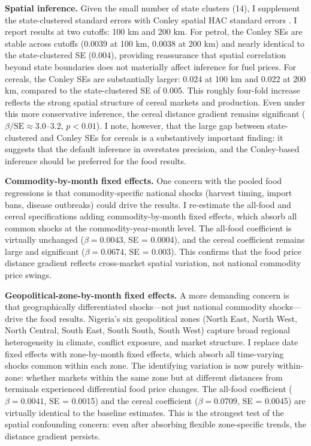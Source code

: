 \documentclass[12pt]{article}
\begin{document}
\textbf{Spatial inference.} Given the small number of state clusters (14), I supplement the state-clustered standard errors with Conley spatial HAC standard errors \citep{Conley1999}. I report results at two cutoffs: 100 km and 200 km. For petrol, the Conley SEs are stable across cutoffs (0.0039 at 100 km, 0.0038 at 200 km) and nearly identical to the state-clustered SE (0.004), providing reassurance that spatial correlation beyond state boundaries does not materially affect inference for fuel prices. For cereals, the Conley SEs are substantially larger: 0.024 at 100 km and 0.022 at 200 km, compared to the state-clustered SE of 0.005. This roughly four-fold increase reflects the strong spatial structure of cereal markets and production. Even under this more conservative inference, the cereal distance gradient remains significant ($\beta / \text{SE} \approx 3.0$--$3.2$, $p < 0.01$). I note, however, that the large gap between state-clustered and Conley SEs for cereals is a substantively important finding: it suggests that the default inference in  overstates precision, and the Conley-based inference should be preferred for the food results.

\textbf{Commodity-by-month fixed effects.} One concern with the pooled food regressions is that commodity-specific national shocks (harvest timing, import bans, disease outbreaks) could drive the results. I re-estimate the all-food and cereal specifications adding commodity-by-month fixed effects, which absorb all common shocks at the commodity-year-month level. The all-food coefficient is virtually unchanged ($\beta = 0.0043$, SE = 0.0004), and the cereal coefficient remains large and significant ($\beta = 0.0674$, SE = 0.003). This confirms that the food price distance gradient reflects cross-market spatial variation, not national commodity price swings.

\textbf{Geopolitical-zone-by-month fixed effects.} A more demanding concern is that geographically differentiated shocks---not just national commodity shocks---drive the food results. Nigeria's six geopolitical zones (North East, North West, North Central, South East, South South, South West) capture broad regional heterogeneity in climate, conflict exposure, and market structure. I replace date fixed effects with zone-by-month fixed effects, which absorb all time-varying shocks common within each zone. The identifying variation is now purely within-zone: whether markets within the same zone but at different distances from terminals experienced differential food price changes. The all-food coefficient ($\beta = 0.0041$, SE = 0.0015) and the cereal coefficient ($\beta = 0.0709$, SE = 0.0045) are virtually identical to the baseline estimates. This is the strongest test of the spatial confounding concern: even after absorbing flexible zone-specific trends, the distance gradient persists.
\end{document}
